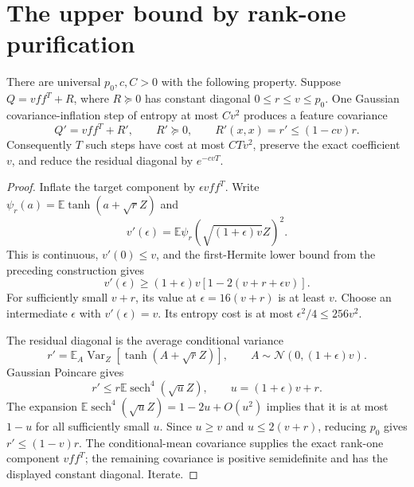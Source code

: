 \section{The upper bound by rank-one purification}
\label{sec:critical-sharp-flattening}

\begin{lemma}
\label{lem:exact-target-purification}
There are universal $p_0,c,C>0$ with the following property.
Suppose $Q=vff^T+R$, where $R\succeq0$ has constant diagonal
$0\le r\le v\le p_0$. One Gaussian covariance-inflation step of
entropy at most $Cv^2$ produces a feature covariance
\[
 Q'=vff^T+R',\qquad R'\succeq0,
 \qquad R'(x,x)=r'\le(1-cv)r.
\]
Consequently $T$ such steps have cost at most $CTv^2$, preserve
the exact coefficient $v$, and reduce the residual diagonal by
$e^{-cvT}$.
\end{lemma}

\begin{proof}
Inflate the target component by $\epsilon vff^T$. Write
$\psi_r(a)=\mathbb E\tanh(a+\sqrt rZ)$ and
\[
 v'(\epsilon)=
 \mathbb E\psi_r(\sqrt{(1+\epsilon)v}Z)^2.
\]
This is continuous, $v'(0)\le v$, and the first-Hermite lower bound
from the preceding construction gives
\[
 v'(\epsilon)\ge(1+\epsilon)v
                   [1-2(v+r+\epsilon v)].
\]
For sufficiently small $v+r$, its value at $\epsilon=16(v+r)$
is at least $v$. Choose an intermediate $\epsilon$ with
$v'(\epsilon)=v$. Its entropy cost is at most
$\epsilon^2/4\le256v^2$.

The residual diagonal is the average conditional variance
\[
 r'=\mathbb E_A\operatorname{Var}_{Z}
               [\tanh(A+\sqrt rZ)],
 \qquad A\sim\mathcal N(0,(1+\epsilon)v).
\]
Gaussian Poincare gives
\[
 r'\le r\mathbb E\operatorname{sech}^4(\sqrt uZ),
 \qquad u=(1+\epsilon)v+r.
\]
The expansion $\mathbb E\operatorname{sech}^4(\sqrt uZ)
=1-2u+O(u^2)$ implies that it is at most $1-u$ for all sufficiently
small $u$. Since $u\ge v$ and $u\le2(v+r)$, reducing $p_0$
gives $r'\le(1-v)r$. The conditional-mean covariance supplies the
exact rank-one component $vff^T$; the remaining covariance is positive
semidefinite and has the displayed constant diagonal. Iterate.
\end{proof}


